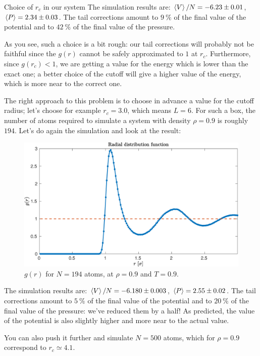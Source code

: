 \documentclass[10pt, compress, protectframetitle, handout]{beamer}
\begin{document}
\begin{frame}[allowframebreaks]{Choice of $r_c$ in our system}
	The simulation results are: $\Braket{V}/N = -6.23 \pm 0.01$, $\Braket{P} = 2.34 \pm 0.03$. The tail corrections amount to $\SI{9}{\percent}$ of the final value of the potential and to $\SI{42}{\percent}$ of the final value of the pressure.
	
	As you see, such a choice is a bit rough: our tail corrections will probably not be faithful since the $g(r)$ cannot be safely approximated to $1$ at $r_c$. Furthermore, since $g(r_c) < 1$, we are getting a value for the energy which is lower than the exact one; a better choice of the cutoff will give a higher value of the energy, which is more near to the correct one.
	
	The right approach to this problem is to choose in advance a value for the cutoff radius; let's choose for example $r_c=3.0$, which means $L=6$. For such a box, the number of atoms required to simulate a system with density $\rho=0.9$ is roughly $194$. Let's do again the simulation and look at the result:
	
	\begin{figure}
		\includegraphics[width=\textwidth]{g(r)_N194}
		\caption{$g(r)$ for $N=194$ atoms, at $\rho=0.9$ and $T=0.9$.}
	\end{figure}
	
	The simulation results are: $\Braket{V}/N = -6.180 \pm 0.003$, $\Braket{P} = 2.55 \pm 0.02$. The tail corrections amount to $\SI{5}{\percent}$ of the final value of the potential and to $\SI{20}{\percent}$ of the final value of the pressure: we've reduced them by a half! As predicted, the value of the potential is also slightly higher and more near to the actual value.
	
	You can also push it further and simulate $N=500$ atoms, which for $\rho=0.9$ correspond to $r_c \simeq 4.1$.
	

\end{frame}
\end{document}
